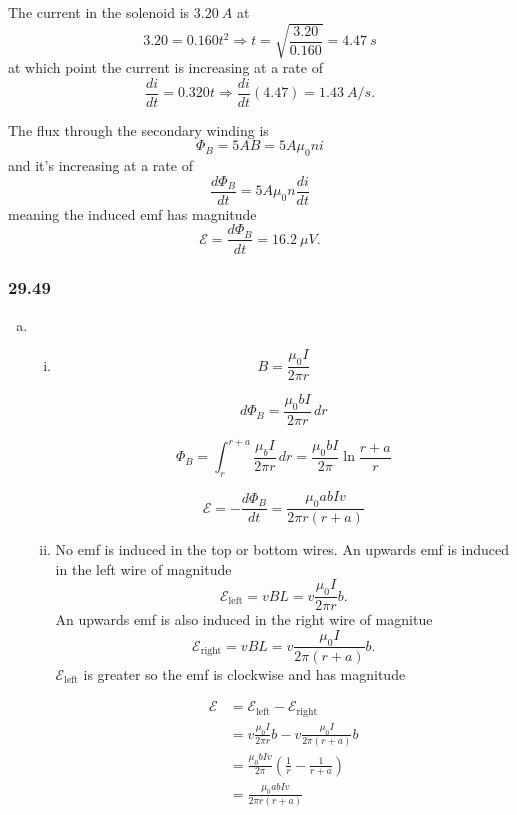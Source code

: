 \documentclass{article}
\begin{document}
The current in the solenoid is $\qty{3.20}{A}$ at \[3.20 = 0.160t^2 \Rightarrow t = \sqrt{\frac{3.20}{0.160}} = \qty{4.47}{s}\] at which point the current is increasing at a rate of \[\frac{di}{dt} = 0.320 t \Rightarrow \frac{di}{dt}(4.47) = \qty{1.43}{A/s}.\]

The flux through the secondary winding is \[\Phi_B = 5 A B = 5 A \mu_0 n i\] and it's increasing at a rate of \[\frac{d \Phi_B}{dt} = 5 A \mu_0 n \frac{di}{dt}\] meaning the induced emf has magnitude \[\mathcal{E} = \frac{d \Phi_B}{dt} = \qty{16.2}{\mu V}.\]

\subsubsection{29.49}

\begin{enumerate}[(a)]
  \item

        \begin{enumerate}[(i)]
          \item

                \[B = \frac{\mu_0 I}{2 \pi r}\]

                \[d \Phi_B = \frac{\mu_0 b I}{2 \pi r} \,dr\]

                \[\Phi_B = \int_r^{r + a} \frac{\mu_ b I}{2 \pi r} \,dr = \frac{\mu_0 b I}{2 \pi} \ln \frac{r + a}{r}\]

                \[\mathcal{E} = -\frac{d \Phi_B}{dt} = \frac{\mu_0 a b I v}{2 \pi r (r + a)}\]

          \item No emf is induced in the top or bottom wires. An upwards emf is induced in the left wire of magnitude \[\mathcal{E}_\text{left} = v B L = v \frac{\mu_0 I}{2 \pi r} b.\] An upwards emf is also induced in the right wire of magnitue \[\mathcal{E}_\text{right} = v B L = v \frac{\mu_0 I}{2 \pi (r + a)} b.\] $\mathcal{E}_\text{left}$ is greater so the emf is clockwise and has magnitude

                \begin{align*}
                  \mathcal{E} & = \mathcal{E}_\text{left} - \mathcal{E}_\text{right}                     \\
                              & = v \frac{\mu_0 I}{2 \pi r} b - v \frac{\mu_0 I}{2 \pi (r + a)} b        \\
                              & = \frac{\mu_0 b I v}{2 \pi} \left( \frac{1}{r} - \frac{1}{r + a} \right) \\
                              & = \frac{\mu_0 a b I v}{2 \pi r (r + a)}
                \end{align*}
        \end{enumerate}


\end{enumerate}
\end{document}
